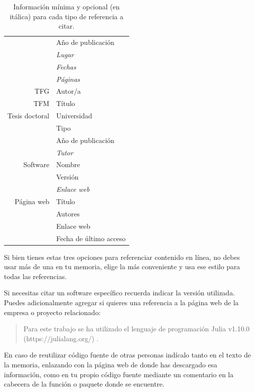 \begin{table}[!hbt]
\begin{minipage}{0.48\linewidth}
\begin{tabular}{r|l}
            & Año de publicación\\
            & {\it Lugar} \\
            & {\it Fechas} \\
            & {\it Páginas} \\
            \midrule
            TFG & Autor/a\\
            TFM & Título \\
            Tesis doctoral & Universidad \\
            & Tipo \\
            & Año de publicación \\
            & {\it Tutor} \\
            \midrule
            Software & Nombre \\
            & Versión \\
            & {\it Enlace web} \\
            \midrule
            Página web & Título \\
            & Autores \\
            & Enlace web \\
            & Fecha de último acceso \\
            \bottomrule
        \end{tabular}
    \end{minipage}
    \caption{Información mínima y opcional (en itálica) para cada tipo de referencia a citar.}
    \label{tab:citar}
\end{table}

Si bien tienes estas tres opciones para referenciar contenido en línea, no debes usar más de una en tu memoria, elige la más conveniente y usa ese estilo para todas las referencias.

Si necesitas citar un software específico recuerda indicar la versión utilizada. Puedes adicionalmente agregar si quieres una referencia a la página web de la empresa o proyecto relacionado:

\begin{quote}
\begin{it}
    Para este trabajo se ha utilizado el lenguaje de programación Julia v1.10.0 (https://julialang.org/) \cite{bezanson2017julia}.
\end{it}
\end{quote}

En caso de reutilizar código fuente de otras personas indícalo tanto en el texto de la memoria, enlazando con la página web de donde has descargado esa información, como en tu propio código fuente mediante un comentario en la cabecera de la función o paquete donde se encuentre.

